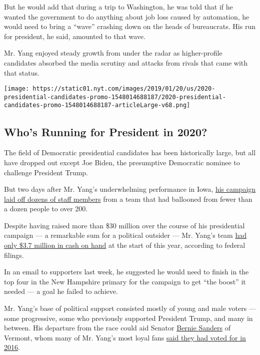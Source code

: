 But he would add that during a trip to Washington, he was told that if
he wanted the government to do anything about job loss caused by
automation, he would need to bring a ``wave'' crashing down on the heads
of bureaucrats. His run for president, he said, amounted to that wave.

Mr. Yang enjoyed steady growth from under the radar as higher-profile
candidates absorbed the media scrutiny and attacks from rivals that came
with that status.

\href{https://www.nytimes.com/interactive/2019/us/politics/2020-presidential-candidates.html}{}

\texttt{[image: https://static01.nyt.com/images/2019/01/20/us/2020-presidential-candidates-promo-1548014688187/2020-presidential-candidates-promo-1548014688187-articleLarge-v68.png]}

\hypertarget{whos-running-for-president-in-2020}{%
\subsection{Who's Running for President in
2020?}\label{whos-running-for-president-in-2020}}

The field of Democratic presidential candidates has been historically
large, but all have dropped out except Joe Biden, the presumptive
Democratic nominee to challenge President Trump.

But two days after Mr. Yang's underwhelming performance in Iowa,
\href{https://www.nytimes.com/live/2020/iowa-caucus-nh-primary-02-06/yang-campaign}{his
campaign laid off dozens of staff members} from a team that had
ballooned from fewer than a dozen people to over 200.

Despite having raised more than \$30 million over the course of his
presidential campaign --- a remarkable sum for a political outsider ---
Mr. Yang's team
\href{https://www.nytimes.com/interactive/2020/02/01/us/elections/democratic-q4-fundraising.html}{had
only \$3.7 million in cash on hand} at the start of this year, according
to federal filings.

In an email to supporters last week, he suggested he would need to
finish in the top four in the New Hampshire primary for the campaign to
get ``the boost'' it needed --- a goal he failed to achieve.

Mr. Yang's base of political support consisted mostly of young and male
voters --- some progressive, some who previously supported President
Trump, and many in between. His departure from the race could aid
Senator
\href{https://www.nytimes.com/interactive/2020/us/elections/bernie-sanders.html}{Bernie
Sanders} of Vermont, whom many of Mr. Yang's most loyal fans
\href{https://www.nytimes.com/2020/01/09/us/politics/bernie-sanders-andrew-yang-tulsi-gabbard.html}{said
they had voted for in 2016}.

